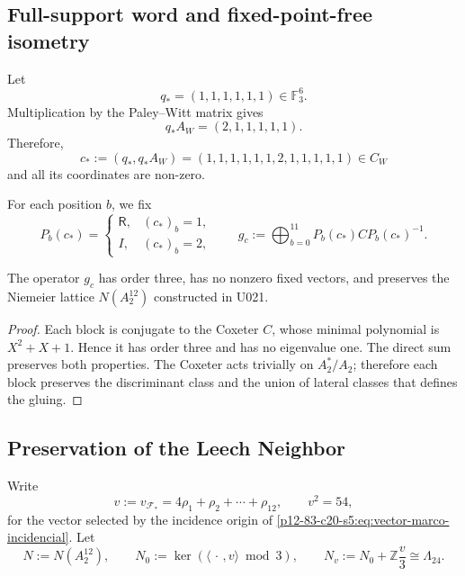 \subsection{Full-support word and fixed-point-free isometry}

Let
\[
 q_*=(1,1,1,1,1,1)\in\mathbb F_3^6.
\]
Multiplication by the Paley--Witt matrix gives
\begin{equation}
 q_*A_W=(2,1,1,1,1,1).
 \label{p12-83-c20-s8:eq:producto-qstar-aw-u031}
\end{equation}
Therefore,
\begin{equation}
 c_*:=(q_*,q_*A_W)
 =(1,1,1,1,1,1,2,1,1,1,1,1)
 \in C_W
 \label{p12-83-c20-s8:eq:palabra-soporte-total-u031}
\end{equation}
and all its coordinates are non-zero.

For each position \(b\), we fix
\begin{equation}
 P_b(c_*)=
 \begin{cases}
  \mathsf R,&(c_*)_b=1,\\
  I,&(c_*)_b=2,
 \end{cases}
 \qquad
 g_c:=\bigoplus_{b=0}^{11}P_b(c_*)CP_b(c_*)^{-1}.
 \label{p12-83-c20-s8:eq:isometria-orden-tres-u031}
\end{equation}

\begin{proposition}
\label{p12-83-c20-s8:prop:isometria-fijo-libre-pegado-u031}
The operator \(g_c\) has order three, has no nonzero fixed vectors, and
preserves the Niemeier lattice \(N(A_2^{12})\) constructed in U021.
\end{proposition}

\begin{proof}
Each block is conjugate to the Coxeter \(C\), whose minimal polynomial is
\(X^2+X+1\). Hence it has order three and has no eigenvalue one. The direct
sum preserves both properties. The Coxeter acts trivially on
\(A_2^*/A_2\); therefore each block preserves the discriminant class and the
union of lateral classes that defines the gluing.
\end{proof}

\subsection{Preservation of the Leech Neighbor}

Write
\[
 v:=v_{\mathcal F_*}
 =4\rho_1+\rho_2+\cdots+\rho_{12},
 \qquad
 v^2=54,
\]
for the vector selected by the incidence origin of
\eqref{p12-83-c20-s5:eq:vector-marco-incidencial}. Let
\[
 N:=N(A_2^{12}),
 \qquad
 N_0:=\ker(\langle\,\cdot\,,v\rangle\bmod3),
 \qquad
 N_v:=N_0+\mathbb Z\frac v3\cong\Lambda_{24}.
\]

